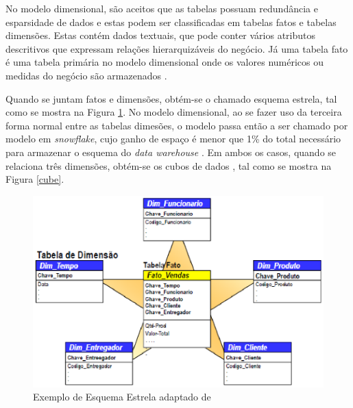 No modelo dimensional, são aceitos que as tabelas possuam redundância e esparsidade de dados e estas podem ser classificadas em tabelas fatos e tabelas dimensões. Estas contém dados textuais, que pode conter vários atributos descritivos que expressam relações hierarquizáveis do negócio. Já uma tabela fato é uma tabela primária no modelo dimensional onde os valores numéricos ou medidas do negócio são armazenados \cite{Kimball2002}. 


Quando se juntam fatos e dimensões, obtém-se o chamado esquema estrela, tal como se mostra na Figura \ref{estrela}. No modelo dimensional, ao se fazer uso da terceira forma normal entre as tabelas dimesões, o modelo passa então a ser chamado por  modelo em \textit{snowflake}, cujo ganho de espaço é menor que 1\% do total necessário para armazenar o esquema do \textit{data warehouse} . Em ambos os casos, quando se relaciona três dimensões, obtém-se os cubos de dados \cite{Kimball2002}, tal como se mostra na Figura \ref{cube}.


\begin{figure}[ht!]
\centering
\includegraphics[keepaspectratio=true,scale=0.2]{figuras/star_schema.eps}
\caption{Exemplo de Esquema Estrela adaptado de }
\label{estrela}
\end{figure}
\FloatBarrier


